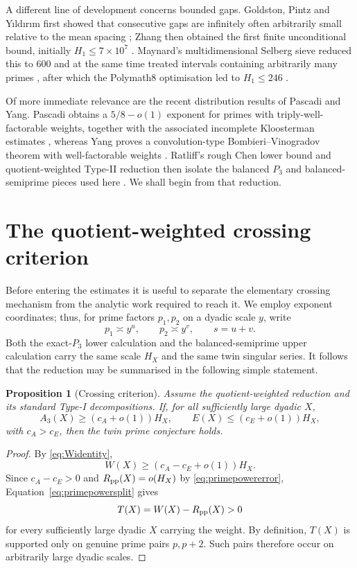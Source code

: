 \documentclass{aomart}
\newtheorem{proposition}[theorem]{Proposition}
\theoremstyle{definition}
\newcommand{\1}{\mathbf 1}
\begin{document}
A different line of development concerns bounded gaps.  Goldston, Pintz and Y\i ld\i r\i m first showed that consecutive gaps are infinitely often arbitrarily small relative to the mean spacing \cite{GPY2009}; Zhang then obtained the first finite unconditional bound, initially $H_1\le7\times10^7$ \cite{Zhang2014}.  Maynard's multidimensional Selberg sieve reduced this to $600$ and at the same time treated intervals containing arbitrarily many primes \cite{Maynard2015}, after which the Polymath8 optimisation led to $H_1\le246$ \cite{Polymath2014}.

Of more immediate relevance are the recent distribution results of Pascadi and Yang.  Pascadi obtains a $5/8-o(1)$ exponent for primes with triply-well-factorable weights, together with the associated incomplete Kloosterman estimates \cite{Pascadi2025}, whereas Yang proves a convolution-type Bombieri--Vinogradov theorem with well-factorable weights \cite{Yang2026}.  Ratliff's rough Chen lower bound and quotient-weighted Type-II reduction then isolate the balanced $P_3$ and balanced-semiprime pieces used here \cite{RatliffReduction2026,RatliffRough2026}.  We shall begin from that reduction.

\section{The quotient-weighted crossing criterion}

Before entering the estimates it is useful to separate the elementary crossing mechanism from the analytic work required to reach it.  We employ exponent coordinates; thus, for prime factors $p_1,p_2$ on a dyadic scale $y$, write
\[
 p_1\asymp y^u,\qquad p_2\asymp y^v,\qquad s=u+v.
\]
Both the exact-$P_3$ lower calculation and the balanced-semiprime upper calculation carry the same scale $H_X$ and the same twin singular series.  It follows that the reduction may be summarised in the following simple statement.

\begin{proposition}[Crossing criterion]\label{prop:crossing}
Assume the quotient-weighted reduction and its standard Type-I decompositions.  If, for all sufficiently large dyadic $X$,
\[
 A_3(X)\ge(c_A+o(1))H_X,
 \qquad
 E(X)\le(c_E+o(1))H_X,
\]
with $c_A>c_E$, then the twin prime conjecture holds.
\end{proposition}

\begin{proof}
By \eqref{eq:Widentity},
\[
 W(X)\ge(c_A-c_E+o(1))H_X.
\]
Since $c_A-c_E>0$ and $R_{\rm pp}(X)=o(H_X)$ by \eqref{eq:primepowererror}, Equation~\eqref{eq:primepowersplit} gives
\[
 T(X)=W(X)-R_{\rm pp}(X)>0
\]
for every sufficiently large dyadic $X$ carrying the weight.  By definition, $T(X)$ is supported only on genuine prime pairs $p,p+2$.  Such pairs therefore occur on arbitrarily large dyadic scales.
\end{proof}
\end{document}

